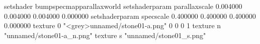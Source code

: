 setshader bumpspecmapparallaxworld
setshaderparam parallaxscale 0.004000 0.004000 0.004000 0.000000
setshaderparam specscale 0.400000 0.400000 0.400000 0.000000
texture 0 "<grey>unnamed/stone01-a.png" 0 0 0 1
texture n "unnamed/stone01-a_n.png"
texture s "unnamed/stone01_s.png"
